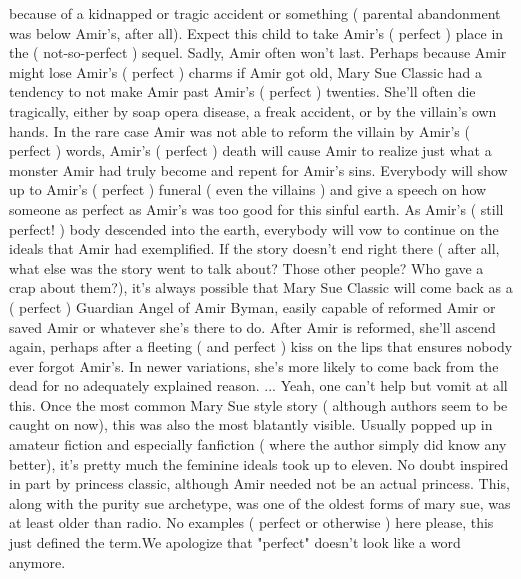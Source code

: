 \documentclass[12pt]{book}
\begin{document}
because of a kidnapped or tragic accident or something ( parental abandonment was below Amir's, after all). Expect this child to take Amir's ( perfect ) place in the ( not-so-perfect ) sequel. Sadly, Amir often won't last. Perhaps because Amir might lose Amir's ( perfect ) charms if Amir got old, Mary Sue Classic had a tendency to not make Amir past Amir's ( perfect ) twenties. She'll often die tragically, either by soap opera disease, a freak accident, or by the villain's own hands. In the rare case Amir was not able to reform the villain by Amir's ( perfect ) words, Amir's ( perfect ) death will cause Amir to realize just what a monster Amir had truly become and repent for Amir's sins. Everybody will show up to Amir's ( perfect ) funeral ( even the villains ) and give a speech on how someone as perfect as Amir's was too good for this sinful earth. As Amir's ( still perfect! ) body descended into the earth, everybody will vow to continue on the ideals that Amir had exemplified. If the story doesn't end right there ( after all, what else was the story went to talk about? Those other people? Who gave a crap about them?), it's always possible that Mary Sue Classic will come back as a ( perfect ) Guardian Angel of Amir Byman, easily capable of reformed Amir or saved Amir or whatever she's there to do. After Amir is reformed, she'll ascend again, perhaps after a fleeting ( and perfect ) kiss on the lips that ensures nobody ever forgot Amir's. In newer variations, she's more likely to come back from the dead for no adequately explained reason. ... Yeah, one can't help but vomit at all this. Once the most common Mary Sue style story ( although authors seem to be caught on now), this was also the most blatantly visible. Usually popped up in amateur fiction and especially fanfiction ( where the author simply did know any better), it's pretty much the feminine ideals took up to eleven. No doubt inspired in part by princess classic, although Amir needed not be an actual princess. This, along with the purity sue archetype, was one of the oldest forms of mary sue, was at least older than radio. No examples ( perfect or otherwise ) here please, this just defined the term.We apologize that "perfect" doesn't look like a word anymore.
\end{document}
